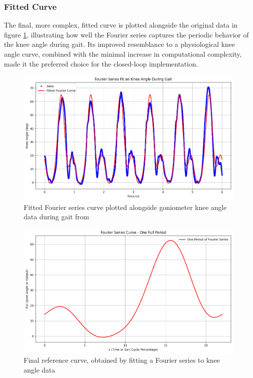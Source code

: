 \subsubsection{Fitted Curve}
The final, more complex, fitted curve is plotted alongside the original data in figure \ref{fig:kneeangleref}, illustrating how well the Fourier series captures the periodic behavior of the knee angle during gait. Its improved resemblance to a physiological knee angle curve, combined with the minimal increase in computational complexity, made it the preferred choice for the closed-loop implementation.
\begin{figure} [H]
    \centering
    \includegraphics[width=0.99\linewidth]{images/goodkneeangleref.png}
    \caption{Fitted Fourier series curve plotted alongside goniometer knee angle data during gait from \cite{camargo_comprehensive_2021}}
    \label{fig:kneeangleref}
\end{figure}
\begin{figure} [H]
    \centering
    \includegraphics[width=0.85\linewidth]{images/fittedKneeAngleRef.png}
    \caption{Final reference curve, obtained by fitting a Fourier series to knee angle data}
    \label{fig:enter-label}
\end{figure}


